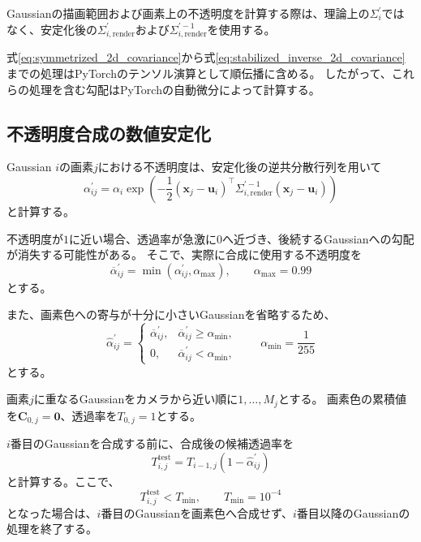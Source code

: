 \documentclass[dvipdfmx]{jlreq}
\begin{document}
Gaussianの描画範囲および画素上の不透明度を計算する際は、理論上の$\Sigma_i^{\prime}$ではなく、安定化後の$\Sigma_{i,\mathrm{render}}^{\prime}$および$\Sigma_{i,\mathrm{render}}^{\prime-1}$を使用する。

式\eqref{eq:symmetrized_2d_covariance}から式\eqref{eq:stabilized_inverse_2d_covariance}までの処理はPyTorchのテンソル演算として順伝播に含める。
したがって、これらの処理を含む勾配はPyTorchの自動微分によって計算する。

\subsection{不透明度合成の数値安定化}
\label{sec:opacity_compositing_stabilization}

Gaussian $i$の画素$j$における不透明度は、安定化後の逆共分散行列を用いて
\begin{equation}
    \alpha_{ij}^{\prime} = \alpha_i \exp\left( -\frac{1}{2} (\bm{x}_j-\bm{u}_i)^{\top} \Sigma_{i,\mathrm{render}}^{\prime-1} (\bm{x}_j-\bm{u}_i) \right)
    \label{eq:implementation_projected_opacity}
\end{equation}
と計算する。

不透明度が$1$に近い場合、透過率が急激に$0$へ近づき、後続するGaussianへの勾配が消失する可能性がある。
そこで、実際に合成に使用する不透明度を
\begin{equation}
    \overline{\alpha}_{ij}^{\prime} = \min\left( \alpha_{ij}^{\prime}, \alpha_{\max} \right), \qquad \alpha_{\max}=0.99
    \label{eq:clamped_projected_opacity}
\end{equation}
とする。

また、画素色への寄与が十分に小さいGaussianを省略するため、
\begin{equation}
    \widehat{\alpha}_{ij}^{\prime} =
    \begin{cases}
        \overline{\alpha}_{ij}^{\prime},
        &
        \overline{\alpha}_{ij}^{\prime}
        \geq\alpha_{\min},
        \\[2mm]
        0,
        &
        \overline{\alpha}_{ij}^{\prime}
        <\alpha_{\min},
    \end{cases}
    \qquad
    \alpha_{\min}=\frac{1}{255}
    \label{eq:opacity_contribution_threshold}
\end{equation}
とする。

画素$j$に重なるGaussianをカメラから近い順に$1,\ldots,M_j$とする。
画素色の累積値を$\bm{C}_{0,j}=\bm{0}$、透過率を$T_{0,j}=1$とする。

$i$番目のGaussianを合成する前に、合成後の候補透過率を
\begin{equation}
    T_{i,j}^{\mathrm{test}} = T_{i-1,j} \left( 1-\widehat{\alpha}_{ij}^{\prime} \right)
    \label{eq:stable_transmittance_accumulation}
\end{equation}
と計算する。ここで、
\begin{equation}
    T_{i,j}^{\mathrm{test}}<T_{\min}, \qquad T_{\min}=10^{-4}
    \label{eq:transmittance_termination}
\end{equation}
となった場合は、$i$番目のGaussianを画素色へ合成せず、$i$番目以降のGaussianの処理を終了する。
\end{document}
